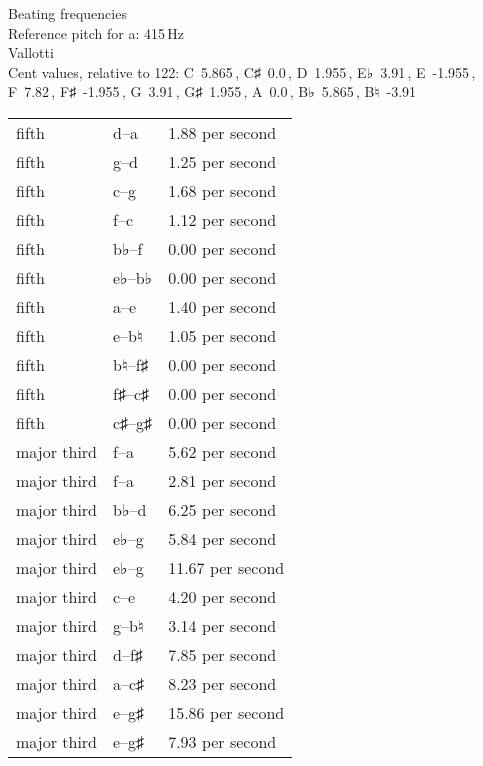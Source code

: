 \documentclass{standalone}
\def\str{\textquotesingle}
\def\cn{\textcent}
\begin{document}
\begin{minipage}{8cm}
\begin{center}
  {\Large Beating frequencies}\\[2ex]
  Reference pitch for a\str: 415\,Hz\\[1ex]
  Vallotti\\[1ex]
  Cent values, relative to 122: C~5.865\,\cn, C♯~0.0\,\cn, D~1.955\,\cn, E♭~3.91\,\cn, E~-1.955\,\cn, F~7.82\,\cn, F♯~-1.955\,\cn, G~3.91\,\cn, G♯~1.955\,\cn, A~0.0\,\cn, B♭~5.865\,\cn, B♮~-3.91\,\cn
\end{center}
\begin{longtable}{p{2cm}p{1cm}p{3cm}}
  \toprule
  fifth & d\str--a\str & 1.88 per second \\fifth & g--d\str & 1.25 per second \\fifth & c\str--g\str & 1.68 per second \\fifth & f--c\str & 1.12 per second \\fifth & b♭--f\str & 0.00 per second \\fifth & e♭--b♭ & 0.00 per second \\fifth & a--e\str & 1.40 per second \\fifth & e--b♮ & 1.05 per second \\fifth & b♮--f♯\str & 0.00 per second \\fifth & f♯--c♯\str & 0.00 per second \\fifth & c♯\str--g♯\str & 0.00 per second \\major third & f\str--a\str & 5.62 per second \\major third & f--a & 2.81 per second \\major third & b♭--d\str & 6.25 per second \\major third & e♭--g & 5.84 per second \\major third & e♭\str--g\str & 11.67 per second \\major third & c\str--e\str & 4.20 per second \\major third & g--b♮ & 3.14 per second \\major third & d\str--f♯\str & 7.85 per second \\major third & a--c♯\str & 8.23 per second \\major third & e\str--g♯\str & 15.86 per second \\major third & e--g♯ & 7.93 per second \\
  \bottomrule
\end{longtable}
\end{minipage}
\end{document}
